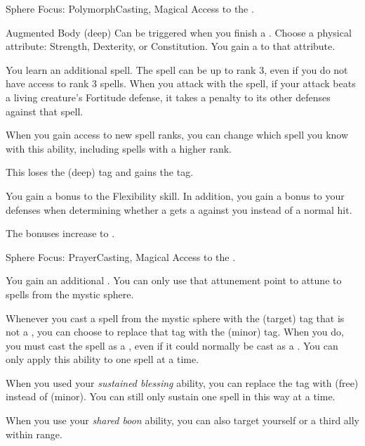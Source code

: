   \begin{magicalfeat}{Sphere Focus: Polymorph}{Casting, Magical}
    \featpre Access to the  .

    \begin{magicalattuneability}{Augmented Body}{ (deep)}
      \abilityusagetime Can be triggered when you finish a .
      \rankline
      Choose a physical attribute: Strength, Dexterity, or Constitution.
      You gain a   to that attribute.
    \end{magicalattuneability}

     You learn an additional spell.
    The spell can be up to rank 3, even if you do not have access to rank 3 spells.
    When you attack with the spell, if your attack beats a living creature's Fortitude defense, it takes a  penalty to its other defenses against that spell.

    When you gain access to new spell ranks, you can change which spell you know with this ability, including spells with a higher rank.

     This loses the  (deep) tag and gains the  tag.

     You gain a  bonus to the Flexibility skill.
    In addition, you gain a  bonus to your defenses when determining whether a  gets a  against you instead of a normal hit.

     The bonuses increase to .
  \end{magicalfeat}

  \begin{magicalfeat}{Sphere Focus: Prayer}{Casting, Magical}
    \featpre Access to the  .

     You gain an additional .
    You can only use that attunement point to attune to spells from the  mystic sphere.

     Whenever you cast a spell from the  mystic sphere with the  (target) tag that is not a , you can choose to replace that tag with the  (minor) tag.
    When you do, you must cast the spell as a , even if it could normally be cast as a .
    You can only apply this ability to one spell at a time.

     When you used your \textit{sustained blessing} ability, you can replace the tag with  (free) instead of  (minor).
    You can still only sustain one spell in this way at a time.

     When you use your \textit{shared boon} ability, you can also target yourself or a third ally within range.
  \end{magicalfeat}

